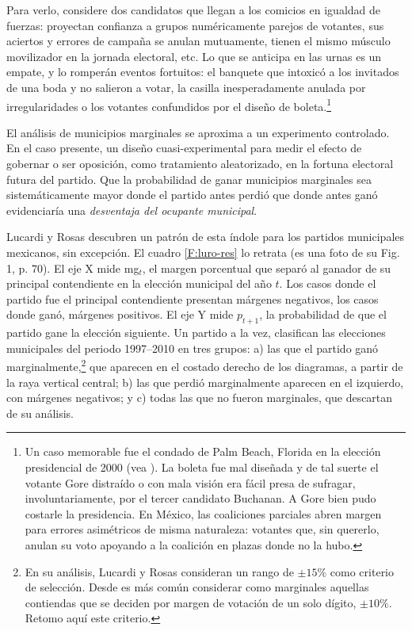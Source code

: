\documentclass[letter,12pt]{article}
\begin{document}
Para verlo, considere dos candidatos que llegan a los comicios en igualdad de fuerzas: proyectan confianza a grupos numéricamente parejos de votantes, sus aciertos y errores de campaña se anulan mutuamente, tienen el mismo músculo movilizador en la jornada electoral, etc. Lo que se anticipa en las urnas es un empate, y lo romperán eventos fortuitos: el banquete que intoxicó a los invitados de una boda y no salieron a votar, la casilla inesperadamente anulada por irregularidades o los votantes confundidos por el diseño de boleta.\footnote{Un caso memorable fue el condado de Palm Beach, Florida en la elección presidencial de 2000 (vea \citet{nyt-cohn-palmbeach.2024}). La boleta fue mal diseñada y de tal suerte el votante Gore distraído o con mala visión era fácil presa de sufragar, involuntariamente, por el tercer candidato Buchanan. A Gore bien pudo costarle la presidencia. En México, las coaliciones parciales abren margen para errores asimétricos de misma naturaleza: votantes que, sin quererlo, anulan su voto apoyando a la coalición en plazas donde no la hubo.}

El análisis de municipios marginales se aproxima a un experimento controlado. En el caso presente, un diseño cuasi-experimental para medir el efecto de gobernar o ser oposición, como tratamiento aleatorizado, en la fortuna electoral futura del partido. Que la probabilidad de ganar municipios marginales sea sistemáticamente mayor donde el partido antes perdió que donde antes ganó evidenciaría una \emph{desventaja del ocupante municipal}.

Lucardi y Rosas descubren un patrón de esta índole para los partidos municipales mexicanos, sin excepción. El cuadro \ref{F:luro-res} lo retrata (es una foto de su Fig. 1, p. 70). El eje X mide mg$_t$, el margen porcentual que separó al ganador de su principal contendiente en la elección municipal del año $t$. Los casos donde el partido fue el principal contendiente presentan márgenes negativos, los casos donde ganó, márgenes positivos. El eje Y mide $p_{t+1}$, la probabilidad de que el partido gane la elección siguiente. Un partido a la vez, clasifican las elecciones municipales del periodo 1997--2010 en tres grupos: a) las que el partido ganó marginalmente,\footnote{En su análisis, Lucardi y Rosas consideran un rango de $\pm 15\%$ como criterio de selección. Desde \citet{mayhew1974vanishingMg} es más común considerar como marginales aquellas contiendas que se deciden por margen de votación de un solo dígito, $\pm 10\%$. Retomo aquí este criterio.} que aparecen en el costado derecho de los diagramas, a partir de la raya vertical central; b) las que perdió marginalmente aparecen en el izquierdo, con márgenes negativos; y c) todas las que no fueron marginales, que descartan de su análisis.
\end{document}
